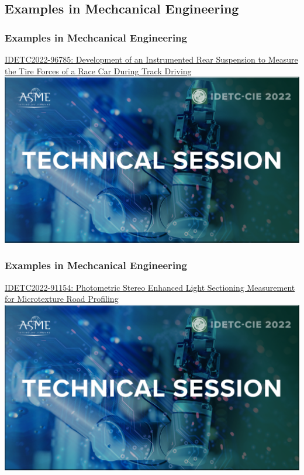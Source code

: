 \documentclass[fleqn]{beamer} %
\newcommand{\sectionIsubsectionIVtitle}{Examples in Mechcanical Engineering}
\begin{document}
		\subsection{\sectionIsubsectionIVtitle}\label{sectionIsubsectionIV}	

			\begin{frame}
				\frametitle{\sectionIsubsectionIVtitle}
				\href{https://events-platform.asmeconferences.org/event/idetc-cie-2022/planning/UGxhbm5pbmdfOTcxMjI2}{IDETC2022-96785: Development of an Instrumented Rear Suspension to Measure the Tire Forces of a Race Car During Track Driving}\vspace{5mm}\\

				\includegraphics[scale=0.125]{images/IDETC_technical_session.png}

			\end{frame}

			\begin{frame}
				\frametitle{\sectionIsubsectionIVtitle}

				\href{https://events-platform.asmeconferences.org/event/idetc-cie-2022/planning/UGxhbm5pbmdfOTcxMzIx}{IDETC2022-91154: Photometric Stereo Enhanced Light Sectioning Measurement for Microtexture Road Profiling}\vspace{5mm}\\

				\includegraphics[scale=0.125]{images/IDETC_technical_session.png}
			 
			\end{frame}
\end{document}
